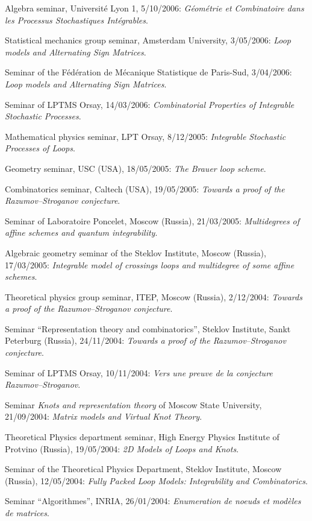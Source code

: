 \s Algebra seminar, Universit\'e Lyon 1, 5/10/2006:
{\sl Géométrie et Combinatoire dans les Processus Stochastiques Intégrables}.

\s Statistical mechanics group seminar, 
Amsterdam University, 3/05/2006: {\sl Loop models and Alternating Sign Matrices}.

\s Seminar of the 
F\'ed\'eration de M\'ecanique Statistique de Paris-Sud, 3/04/2006:
{\sl Loop models and Alternating Sign Matrices}.

\s Seminar of LPTMS Orsay, 14/03/2006:
{\sl Combinatorial Properties of Integrable Stochastic Processes}.

\s Mathematical physics seminar,
LPT Orsay, 8/12/2005: {\sl Integrable Stochastic Processes of Loops}.

\s Geometry seminar, USC (USA), 18/05/2005: {\sl The Brauer loop scheme}.

\s Combinatorics seminar, Caltech (USA), 19/05/2005: {\sl Towards a proof of the Razumov--Stroganov conjecture}.

\s Seminar of Laboratoire Poncelet, Moscow (Russia), 21/03/2005: {\sl Multidegrees of affine schemes and quantum integrability}.

\s Algebraic geometry seminar of the Steklov Institute,
Moscow (Russia), 17/03/2005: {\sl Integrable model of crossings loops and multidegree of some affine schemes}.

\s Theoretical physics group seminar,
ITEP, Moscow (Russia), 2/12/2004:
{\sl Towards a proof of the Razumov--Stroganov conjecture}.

\s Seminar ``Representation theory and combinatorics'', Steklov Institute, Sankt Peterburg (Russia),
24/11/2004: {\sl Towards a proof of the Razumov--Stroganov conjecture}.

\s Seminar of LPTMS Orsay, 10/11/2004: {\sl Vers une preuve de la conjecture Razumov--Stroganov}.

\s Seminar {\sl Knots and representation theory} of Moscow State University, 
21/09/2004:
{\sl Matrix models and Virtual Knot Theory}.

\s Theoretical Physics department seminar,
High Energy Physics Institute of
Protvino (Russia), 19/05/2004: {\sl 2D Models of Loops and Knots}.

\s Seminar of the Theoretical Physics Department, Steklov Institute,
Moscow (Russia), 12/05/2004: 
{\sl Fully Packed Loop Models: Integrability and
Combinatorics}.

\s Seminar ``Algorithmes'', INRIA, 26/01/2004: 
{\sl Enumeration de noeuds et mod\`eles de matrices}.

